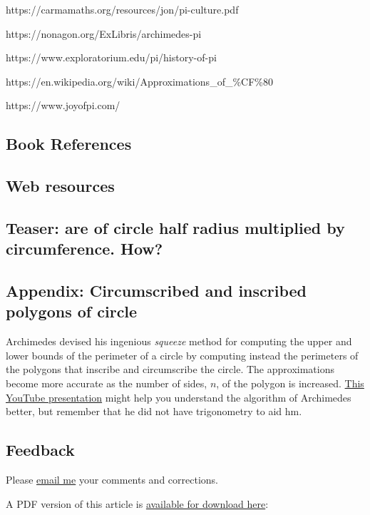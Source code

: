 \documentclass[
  a4paper,
]{article}
\begin{document}
https://carmamaths.org/resources/jon/pi-culture.pdf

https://nonagon.org/ExLibris/archimedes-pi

https://www.exploratorium.edu/pi/history-of-pi

https://en.wikipedia.org/wiki/Approximations\_of\_\%CF\%80

https://www.joyofpi.com/

\subsection{Book References}\label{book-references}

\subsection{Web resources}\label{web-resources}

\subsection{Teaser: are of circle half radius multiplied by
circumference.
How?}\label{teaser-are-of-circle-half-radius-multiplied-by-circumference.-how}

\subsection{Appendix: Circumscribed and inscribed polygons of
circle}\label{appendix-circumscribed-and-inscribed-polygons-of-circle}

Archimedes devised his ingenious \emph{squeeze} method for computing the
upper and lower bounds of the perimeter of a circle by computing instead
the perimeters of the polygons that inscribe and circumscribe the
circle. The approximations become more accurate as the number of sides,
\(n\), of the polygon is increased.
\href{https://www.youtube.com/watch?v=_qdnyw5Eb_Y}{This YouTube
presentation} might help you understand the algorithm of Archimedes
better, but remember that he did not have trigonometry to aid hm.

\subsection{Feedback}\label{feedback}

Please \href{mailto:feedback.swanlotus@gmail.com}{email me} your
comments and corrections.

\noindent A PDF version of this article is
\href{./the-pi-of-archimedes.pdf}{available for download here}:
\end{document}

